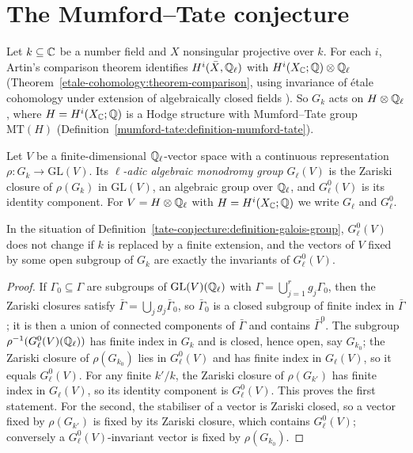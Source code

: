 \section{The Mumford--Tate conjecture}\label{tate-conjecture:section-mumford-tate}

Let $k \subseteq \mathbb{C}$ be a number field and $X$ nonsingular projective over $k$. For each $i$, Artin's comparison theorem identifies $H^i(\bar X, \mathbb{Q}_\ell)$ with $H^i(X_{\mathbb{C}}; \mathbb{Q}) \otimes \mathbb{Q}_\ell$
(Theorem~\ref{etale-cohomology:theorem-comparison}, using invariance of \'etale cohomology under extension of algebraically closed fields \cite{milne-etale}). So $G_k$ acts on $H \otimes \mathbb{Q}_\ell$, where
$H = H^i(X_{\mathbb{C}}; \mathbb{Q})$ is a Hodge structure with Mumford--Tate group $\mathrm{MT}(H)$ (Definition~\ref{mumford-tate:definition-mumford-tate}).

\begin{definition}\label{tate-conjecture:definition-galois-group}
Let $V$ be a finite-dimensional $\mathbb{Q}_\ell$-vector space with a continuous representation $\rho \colon G_k \to \mathrm{GL}(V)$. Its \emph{$\ell$-adic algebraic monodromy group} $G_\ell(V)$ is the Zariski closure of
$\rho(G_k)$ in $\mathrm{GL}(V)$, an algebraic group over $\mathbb{Q}_\ell$, and $G_\ell^0(V)$ is its identity component. For $V = H \otimes \mathbb{Q}_\ell$ with $H = H^i(X_{\mathbb{C}}; \mathbb{Q})$ we write $G_\ell$ and $G_\ell^0$.
\end{definition}

\begin{lemma}\label{tate-conjecture:lemma-identity-component}
In the situation of Definition~\ref{tate-conjecture:definition-galois-group}, $G_\ell^0(V)$ does not change if $k$ is replaced by a finite extension, and the vectors of $V$ fixed by some open subgroup of $G_k$ are
exactly the invariants of $G_\ell^0(V)$.
\end{lemma}

\begin{proof}
If $\Gamma_0 \subseteq \Gamma$ are subgroups of $\mathrm{GL}(V)(\mathbb{Q}_\ell)$ with $\Gamma = \bigcup_{j=1}^rg_j\Gamma_0$, then the Zariski closures satisfy $\bar\Gamma = \bigcup_jg_j\bar\Gamma_0$, so $\bar\Gamma_0$ is a closed subgroup of finite index
in $\bar\Gamma$; it is then a union of connected components of $\bar\Gamma$ and contains $\bar\Gamma^0$. The subgroup $\rho^{-1}(G_\ell^0(V)(\mathbb{Q}_\ell))$ has finite index in $G_k$ and is closed, hence open, say $G_{k_0}$; the Zariski
closure of $\rho(G_{k_0})$ lies in $G_\ell^0(V)$ and has finite index in $G_\ell(V)$, so it equals $G_\ell^0(V)$. For any finite $k'/k$, the Zariski closure of $\rho(G_{k'})$ has finite index in $G_\ell(V)$, so its identity
component is $G_\ell^0(V)$. This proves the first statement. For the second, the stabiliser of a vector is Zariski closed, so a vector fixed by $\rho(G_{k'})$ is fixed by its Zariski closure, which contains $G_\ell^0(V)$;
conversely a $G_\ell^0(V)$-invariant vector is fixed by $\rho(G_{k_0})$.
\end{proof}


